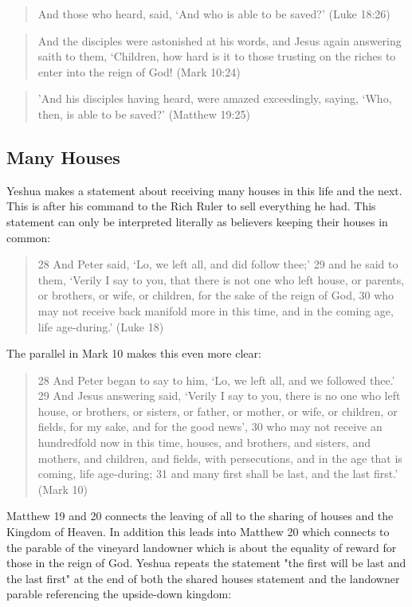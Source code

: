 \documentclass[11pt]{article}
\begin{document}
\begin{quote}
And those who heard, said, `And who is able to be saved?' (Luke 18:26)
\end{quote}
\begin{quote}
And the disciples were astonished at his words, and Jesus again answering saith to them, `Children, how hard is it to those trusting on the riches to enter into the reign of God! (Mark 10:24) 
\end{quote}
\begin{quote}
'And his disciples having heard, were amazed exceedingly, saying, `Who, then, is able to be saved?' (Matthew 19:25)
\end{quote}

\subsection{Many Houses}
Yeshua makes a statement about receiving many houses in this life and the next. This is after his command to the Rich Ruler to sell everything he had. This statement can only be interpreted literally as believers keeping their houses in common:
\begin{quote}
28 And Peter said, `Lo, we left all, and did follow thee;' 29 and he said to them, `Verily I say to you, that there is not one who left house, or parents, or brothers, or wife, or children, for the sake of the reign of God, 30 who may not receive back manifold more in this time, and in the coming age, life age-during.' (Luke 18)
\end{quote}
The parallel in Mark 10 makes this even more clear:
\begin{quote}
28 And Peter began to say to him, `Lo, we left all, and we followed thee.'
29 And Jesus answering said, `Verily I say to you, there is no one who left house, or brothers, or sisters, or father, or mother, or wife, or children, or fields, for my sake, and for the good news',
30 who may not receive an hundredfold now in this time, houses, and brothers, and sisters, and mothers, and children, and fields, with persecutions, and in the age that is coming, life age-during;
31 and many first shall be last, and the last first.' (Mark 10)
\end{quote}
Matthew 19 and 20 connects the leaving of all to the sharing of houses and the Kingdom of Heaven. In addition this leads into Matthew 20 which connects to the parable of the vineyard landowner which is about the equality of reward for those in the reign of God. Yeshua repeats the statement "the first will be last and the last first" at the end of both the shared houses statement and the landowner parable referencing the upside-down kingdom:
\end{document}

